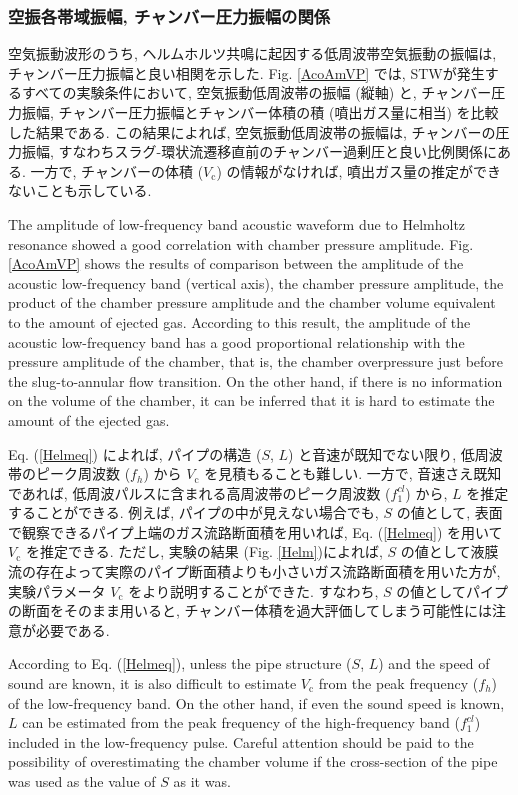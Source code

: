 \documentclass[12pt]{article}
\begin{document}
\subsubsection{空振各帯域振幅, チャンバー圧力振幅の関係}
空気振動波形のうち, ヘルムホルツ共鳴に起因する低周波帯空気振動の振幅は, チャンバー圧力振幅と良い相関を示した. 
Fig. \ref{AcoAmVP} では, STWが発生するすべての実験条件において, 空気振動低周波帯の振幅 (縦軸) と, チャンバー圧力振幅, チャンバー圧力振幅とチャンバー体積の積 (噴出ガス量に相当) を比較した結果である. 
この結果によれば, 空気振動低周波帯の振幅は, チャンバーの圧力振幅, すなわちスラグ-環状流遷移直前のチャンバー過剰圧と良い比例関係にある. 
一方で, チャンバーの体積 ($V_\mathrm{c}$) の情報がなければ, 噴出ガス量の推定ができないことも示している. 

The amplitude of low-frequency band acoustic waveform due to Helmholtz resonance showed a good correlation with chamber pressure amplitude.
Fig. \ref{AcoAmVP} shows the results of comparison between the amplitude of the acoustic low-frequency band (vertical axis), the chamber pressure amplitude, the product of the chamber pressure amplitude and the chamber volume equivalent to the amount of ejected gas.
According to this result, the amplitude of the acoustic low-frequency band has a good proportional relationship with the pressure amplitude of the chamber, that is, the chamber overpressure just before the slug-to-annular flow transition.
On the other hand, if there is no information on the volume of the chamber, it can be inferred that it is hard to estimate the amount of the ejected gas.

Eq. (\ref{Helmeq}) によれば, パイプの構造 ($S$, $L$) と音速が既知でない限り, 低周波帯のピーク周波数  ($f_{h}$)  から $V_\mathrm{c}$ を見積もることも難しい. 
一方で, 音速さえ既知であれば, 低周波パルスに含まれる高周波帯のピーク周波数 ($f^{cl}_{1}$) から, $L$ を推定することができる.
 例えば, パイプの中が見えない場合でも, $S$ の値として, 表面で観察できるパイプ上端のガス流路断面積を用いれば, Eq. (\ref{Helmeq}) を用いて $V_\mathrm{c}$ を推定できる. 
ただし, 実験の結果 (Fig. \ref{Helm})によれば, $S$ の値として液膜流の存在よって実際のパイプ断面積よりも小さいガス流路断面積を用いた方が, 実験パラメータ $V_\mathrm{c}$ をより説明することができた. すなわち, $S$ の値としてパイプの断面をそのまま用いると, チャンバー体積を過大評価してしまう可能性には注意が必要である.

According to Eq. (\ref{Helmeq}), unless the pipe structure ($S$, $L$) and the speed of sound are known, it is also difficult to estimate $V_\mathrm{c}$ from the peak frequency ($f_{h}$) of the low-frequency band.
On the other hand, if even the sound speed is known, $L$ can be estimated from the peak frequency of the high-frequency band ($f^{cl}_{1}$) included in the low-frequency pulse.
Careful attention should be paid to the possibility of overestimating the chamber volume if the cross-section of the pipe was used as the value of $S$ as it was.
\end{document}
